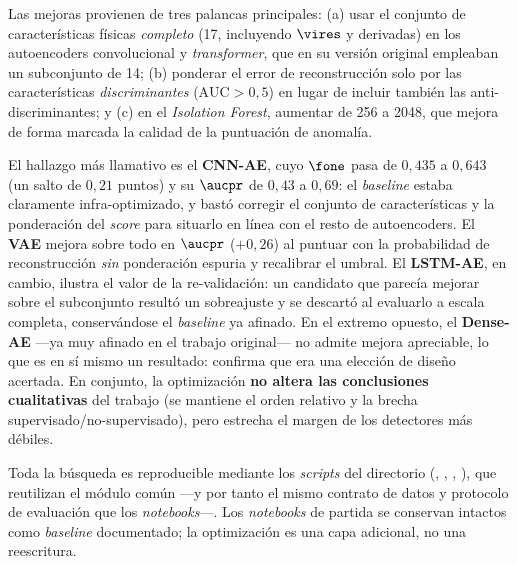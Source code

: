 Las mejoras provienen de tres palancas principales: (a) usar el conjunto de
características físicas \emph{completo} (17, incluyendo $\vires$ y derivadas) en
los autoencoders convolucional y \emph{transformer}, que en su versión original
empleaban un subconjunto de 14; (b) ponderar el error de reconstrucción solo por
las características \emph{discriminantes} ($\mathrm{AUC}>0{,}5$) en lugar de
incluir también las anti-discriminantes; y (c) en el \emph{Isolation Forest},
aumentar  de 256 a 2048, que mejora de forma marcada la
calidad de la puntuación de anomalía.

El hallazgo más llamativo es el \textbf{CNN-AE}, cuyo $\fone$ pasa de $0{,}435$ a
$0{,}643$ (un salto de $0{,}21$ puntos) y su $\aucpr$ de $0{,}43$ a $0{,}69$: el
\emph{baseline} estaba claramente infra-optimizado, y bastó corregir el conjunto
de características y la ponderación del \emph{score} para situarlo en línea con el
resto de autoencoders. El \textbf{VAE} mejora sobre todo en $\aucpr$ ($+0{,}26$)
al puntuar con la probabilidad de reconstrucción \emph{sin} ponderación espuria y
recalibrar el umbral. El \textbf{LSTM-AE}, en cambio, ilustra el valor de la re-validación: un candidato
que parecía mejorar sobre el subconjunto resultó un sobreajuste y se descartó al
evaluarlo a escala completa, conservándose el \emph{baseline} ya afinado. En el extremo opuesto,
el \textbf{Dense-AE} ---ya muy afinado en el trabajo original--- no admite mejora
apreciable, lo que es en sí mismo un resultado: confirma que era una elección de
diseño acertada. En conjunto, la optimización \textbf{no altera las conclusiones
cualitativas} del trabajo (se mantiene el orden relativo y la brecha
supervisado/no-supervisado), pero estrecha el margen de los detectores más
débiles.

\begin{observacion}[Reproducibilidad]
Toda la búsqueda es reproducible mediante los \emph{scripts} del directorio
 (, ,
, ), que reutilizan el módulo común
 ---y por tanto el mismo contrato de datos y protocolo de
evaluación que los \emph{notebooks}---. Los \emph{notebooks} de partida se
conservan intactos como \emph{baseline} documentado; la optimización es una capa
adicional, no una reescritura.
\end{observacion}

